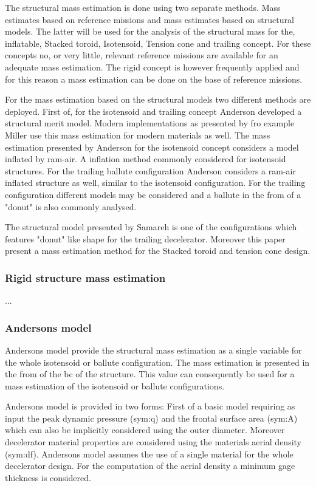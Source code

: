 The structural mass estimation is done using two separate methods. Mass estimates based on reference missions and mass estimates based on structural models. The latter will be used for the analysis of the structural mass for the, inflatable, Stacked toroid, Isotensoid, Tension cone and trailing concept. For these concepts no, or very little, relevant reference missions are available for an adequate mass estimation. The rigid concept is however frequently applied and for this reason a mass estimation can be done on the base of reference missions.

For the mass estimation based on the structural models two different methods are deployed. First of, for the isotensoid and trailing concept Anderson \cite{Anderson1969} developed a structural merit model. Modern implementations as presented by fro example Miller \cite{Miller2014} use this mass estimation for modern materials as well. The mass estimation presented by Anderson for the isotensoid concept considers a model inflated by ram-air. A inflation method commonly considered for isotensoid structures\cite{Smith2011}. For the trailing ballute configuration Anderson considers a ram-air inflated structure as well, similar to the isotensoid configuration. For the trailing configuration different models may be considered and a ballute in the from of a "donut" is also commonly analysed. 

The structural model presented by Samareh\cite{Samareh2011} is one of the configurations which features "donut" like shape for the trailing decelerator. Moreover this paper present a mass estimation method for the Stacked toroid and tension cone design.

\subsubsection{Rigid structure mass estimation}

...

\subsubsection{Andersons model}
Andersons model provide the structural mass estimation as a single variable for the whole isotensoid or ballute configuration. The mass estimation is presented in the from of the \gls{bc} of the structure. This value can consequently be used for a mass estimation of the isotensoid or ballute configurations.

Andersons model is provided in two forms: First of a basic model requiring as input the peak dynamic pressure (\gls{sym:q}) and the frontal surface area (\gls{sym:A}) which can also be implicitly considered using the outer diameter. Moreover decelerator material properties are considered using the materials aerial density (\gls{sym:df}). Andersons model assumes the use of a single material for the whole decelerator design. For the computation of the aerial density a minimum gage thickness is considered.

